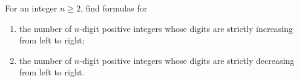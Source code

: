 For an integer $n\ge2$, find formulas for
\begin{enumerate}
\item[(a)] the number of $n$-digit positive integers whose digits are strictly increasing from left to right;
\item[(b)] the number of $n$-digit positive integers whose digits are strictly decreasing from left to right.
\end{enumerate}
